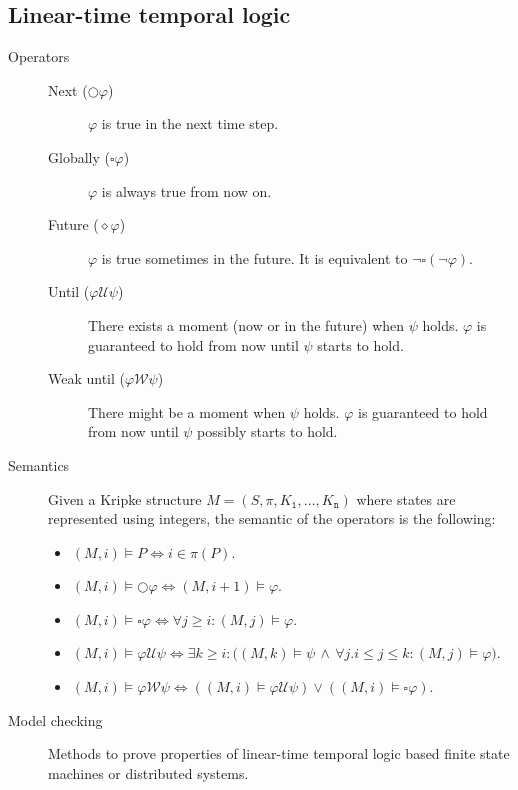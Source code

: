 \subsection{Linear-time temporal logic}

\begin{description}
    \item[Operators] \phantom{}
        \begin{description}
            \item[Next ($\bigcirc \varphi$)] 
                $\varphi$ is true in the next time step.

            \item[Globally ($\square \varphi$)] 
                $\varphi$ is always true from now on.

            \item[Future ($\diamond \varphi$)] 
                $\varphi$ is true sometimes in the future.
                It is equivalent to $\lnot\square(\lnot \varphi)$.

            \item[Until ($\varphi \mathcal{U} \psi$)] 
                There exists a moment (now or in the future) when $\psi$ holds. 
                $\varphi$ is guaranteed to hold from now until $\psi$ starts to hold.

            \item[Weak until ($\varphi \mathcal{W} \psi$)] 
                There might be a moment when $\psi$ holds. 
                $\varphi$ is guaranteed to hold from now until $\psi$ possibly starts to hold.
        \end{description}

    \item[Semantics]
        Given a Kripke structure $M = (S, \pi, K_\texttt{1}, \dots, K_\texttt{n})$ where states are represented using integers,
        the semantic of the operators is the following:
        \begin{itemize}
            \item $(M, i) \models P \iff i \in \pi(P)$.
            \item $(M, i) \models \bigcirc\varphi \iff (M, i+1) \models \varphi$.
            \item $(M, i) \models \square\varphi \iff \forall j \geq i: (M, j) \models \varphi$.
            \item $(M, i) \models \varphi \mathcal{U} \psi \iff \exists k \geq i: \big( (M, k) \models \psi \,\land\, \forall j. i \leq j \leq k: (M, j) \models \varphi \big)$.
            \item $(M, i) \models \varphi \mathcal{W} \psi \iff ((M, i) \models \varphi \mathcal{U} \psi) \vee ((M, i) \models \square\varphi)$.
        \end{itemize}

    \item[Model checking] 
        Methods to prove properties of linear-time temporal logic based finite state machines or distributed systems.
\end{description}